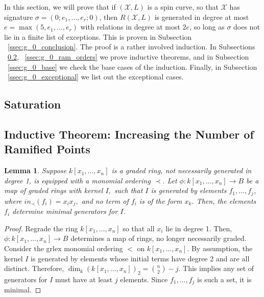 \documentclass{amsart}
\theoremstyle{plain}
\newtheorem{lem}[thm]{Lemma}
\theoremstyle{definition}
\theoremstyle{remark}
\numberwithin{equation}{section}
\newcommand\ssec{\subsection}
\newcommand \sx{\mathscr X}
\begin{document}
In this section, we will prove that if $(\sx,L)$ is a spin curve, so that $\sx$ has signature $\sigma = (0;e_1,\ldots, e_r;0)$, then $R(\sx,L)$ is generated in degree at most $e = \max(5,e_1,\ldots, e_r)$ with relations in degree at most $2e$, so long as $\sigma$ does not lie in a finite list of exceptions. This is proven in Subsection ~\ref{ssec:g_0_conclusion}. The proof is a rather involved induction. In Subsections ~\ref{ssec:g_0_ram_pts}, ~\ref{ssec:g_0_ram_orders} we prove inductive theorems, and in Subsection ~\ref{ssec:g_0_base} we check the base cases of the induction. Finally, in Subsection ~\ref{ssec:g_0_exceptional} we list out the exceptional cases.

\ssec{Saturation}
\label{ssec:g_0_saturation}

\ssec{Inductive Theorem: Increasing the Number of Ramified Points}
\label{ssec:g_0_ram_pts}

\begin{lem}
\label{lem:minimal_quadratic}
Suppose $k[x_1,\ldots, x_n]$ is a graded ring, not necessarily generated in degree 1, is equipped with a monomial ordering $\prec.$ Let $\phi:k[x_1,\ldots, x_n] \rightarrow B$ be a map of graded rings with kernel $I,$ such that $I$ is generated by elements $f_1,\ldots, f_j$, where $in_\prec(f_i) = x_ix_j,$ and no term of $f_i$ is of the form $x_k$. Then, the elements $f_i$ determine minimal generators for $I$.
\end{lem}
\begin{proof}
Regrade the ring $k[x_1,\ldots, x_n]$ so that all $x_i$ lie in degree 1. Then, $\phi:k[x_1,\ldots, x_n]\rightarrow B$ determines a map of rings, no longer necessarily graded. Consider the grlex monomial ordering $<$ on $k[x_1,\ldots, x_n]$. By assumption, the kernel $I$ is generated by elements whose initial terms have degree 2 and are all distinct. Therefore, $\dim_k (k[x_1,\ldots, x_n])_2 = \binom{n}{2}-j.$ This implies any set of generators for $I$ must have at least $j$ elements. Since $f_1,\ldots, f_j$ is such a set, it is minimal.
\end{proof}
\end{document}
